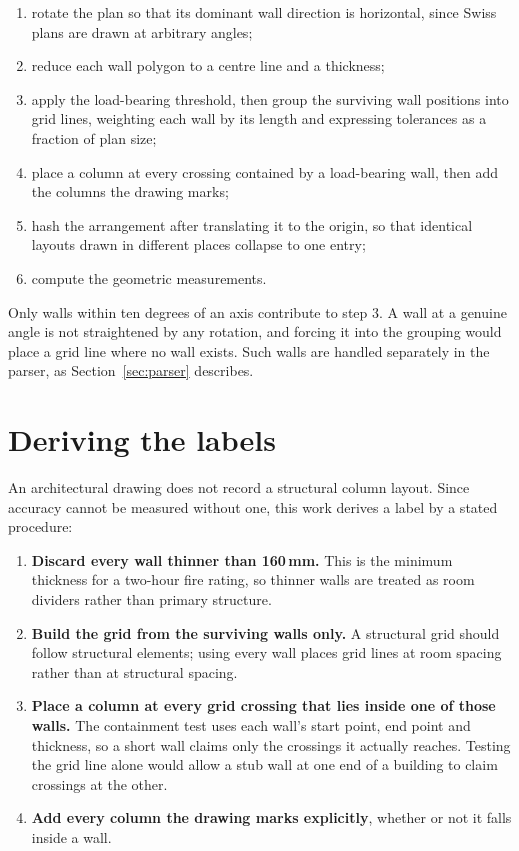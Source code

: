 \begin{enumerate}
\item rotate the plan so that its dominant wall direction is horizontal,
since Swiss plans are drawn at arbitrary angles;
\item reduce each wall polygon to a centre line and a thickness;
\item apply the load-bearing threshold, then group the surviving wall
positions into grid lines, weighting each wall by its length and
expressing tolerances as a fraction of plan size;
\item place a column at every crossing contained by a load-bearing wall,
then add the columns the drawing marks;
\item hash the arrangement after translating it to the origin, so that
identical layouts drawn in different places collapse to one entry;
\item compute the geometric measurements.
\end{enumerate}

Only walls within ten degrees of an axis contribute to step 3. A wall at a
genuine angle is not straightened by any rotation, and forcing it into the
grouping would place a grid line where no wall exists. Such walls are
handled separately in the parser, as Section~\ref{sec:parser} describes.

\section{Deriving the labels}
\label{sec:labels}

An architectural drawing does not record a structural column layout. Since
accuracy cannot be measured without one, this work derives a label by a
stated procedure:

\begin{enumerate}
\item \textbf{Discard every wall thinner than 160\,mm.} This is the
minimum thickness for a two-hour fire rating, so thinner walls are treated
as room dividers rather than primary structure.
\item \textbf{Build the grid from the surviving walls only.} A structural
grid should follow structural elements; using every wall places grid lines
at room spacing rather than at structural spacing.
\item \textbf{Place a column at every grid crossing that lies inside one of
those walls.} The containment test uses each wall's start point, end point
and thickness, so a short wall claims only the crossings it actually
reaches. Testing the grid line alone would allow a stub wall at one end of
a building to claim crossings at the other.
\item \textbf{Add every column the drawing marks explicitly}, whether or
not it falls inside a wall.
\end{enumerate}

